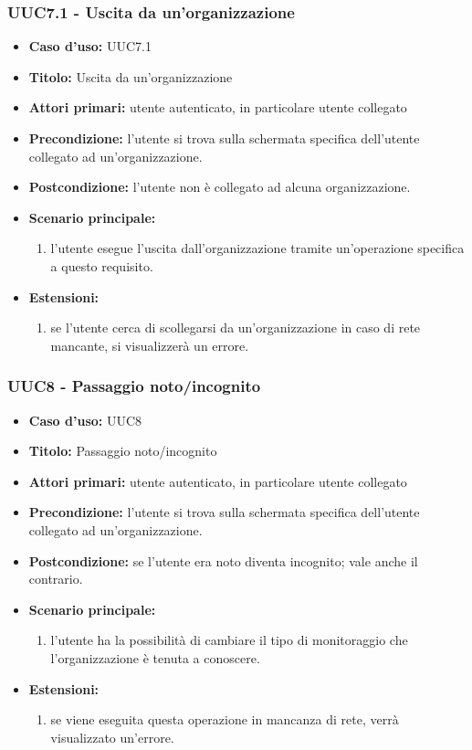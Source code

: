 \documentclass[casi-duso]{subfiles}
\begin{document}
\subsubsection{UUC7.1 - Uscita da un'organizzazione}%
\label{subsub:UUC7.1utente}
\begin{itemize}
  \item \textbf{Caso d’uso:} UUC7.1
  \item \textbf{Titolo:} Uscita da un'organizzazione
  \item \textbf{Attori primari:} utente autenticato, in particolare utente collegato
  \item \textbf{Precondizione:} l'utente si trova sulla schermata specifica dell'utente collegato ad un'organizzazione.
  \item \textbf{Postcondizione:} l'utente non è collegato ad alcuna organizzazione.
  \item \textbf{Scenario principale:}
  \begin{enumerate}
    \item l'utente esegue l'uscita dall'organizzazione tramite un'operazione specifica a questo requisito.
  \end{enumerate}
  \item \textbf{Estensioni:}
  \begin{enumerate}
    \item se l'utente cerca di scollegarsi da un'organizzazione in caso di rete mancante, si visualizzerà un errore.
  \end{enumerate}
\end{itemize}

\subsubsection{UUC8 - Passaggio noto/incognito}%
\label{subsub:UUC8utente}
\begin{itemize}
  \item \textbf{Caso d’uso:} UUC8
  \item \textbf{Titolo:} Passaggio noto/incognito
  \item \textbf{Attori primari:} utente autenticato, in particolare utente collegato
  \item \textbf{Precondizione:} l'utente si trova sulla schermata specifica dell'utente collegato ad un'organizzazione.
  \item \textbf{Postcondizione:} se l'utente era noto diventa incognito; vale anche il contrario.
  \item \textbf{Scenario principale:}
  \begin{enumerate}
    \item l'utente ha la possibilità di cambiare il tipo di monitoraggio che l'organizzazione è tenuta a conoscere.
  \end{enumerate}
  \item \textbf{Estensioni:}
  \begin{enumerate}
    \item se viene eseguita questa operazione in mancanza di rete, verrà visualizzato un'errore.
  \end{enumerate}
\end{itemize}
\end{document}
